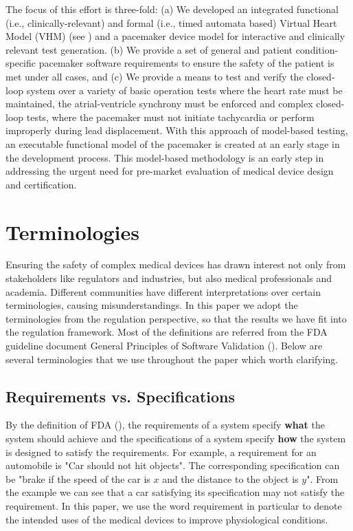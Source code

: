The focus of this effort is three-fold: (a) We developed an integrated functional (i.e., clinically-relevant) and formal (i.e., timed automata based) Virtual Heart Model  (VHM) (see ) and a pacemaker device model for interactive and clinically relevant test generation.  (b) We provide a set of general and patient condition-specific pacemaker software requirements to ensure the safety of the patient is met under all cases, and (c) We provide a means to test and verify the closed-loop system over a variety of basic operation tests where the heart rate must be maintained, the atrial-ventricle synchrony must be enforced and complex closed-loop tests, where the pacemaker must not initiate tachycardia or perform improperly during lead displacement. With this approach of model-based testing, an executable functional model of the pacemaker is created at an early stage in the development process. This model-based methodology is an early step in addressing the urgent need for pre-market evaluation of medical device design and certification.


\section{Terminologies}
Ensuring the safety of complex medical devices has drawn interest not only from stakeholders like regulators and industries, but also medical professionals and academia. Different communities have different interpretations over certain terminologies, causing misunderstandings. In this paper we adopt the terminologies from the regulation perspective, so that the results we have fit into the regulation framework. Most of the definitions are referred from the FDA guideline document General Principles of Software Validation (\cite{fda2}). Below are several terminologies that we use throughout the paper which worth clarifying.
\subsection{Requirements vs. Specifications}
By the definition of FDA (\cite{fda3}), the requirements of a system specify \textbf{what} the system should achieve and the specifications of a system specify \textbf{how} the system is designed to satisfy the requirements. For example, a requirement for an automobile is "Car should not hit objects". The corresponding specification can be "brake if the speed of the car is $x$ and the distance to the object is $y$". From the example we can see that a car satisfying its specification may not satisfy the requirement. In this paper, we use the word requirement in particular to denote the intended uses of the medical devices to improve physiological conditions.

